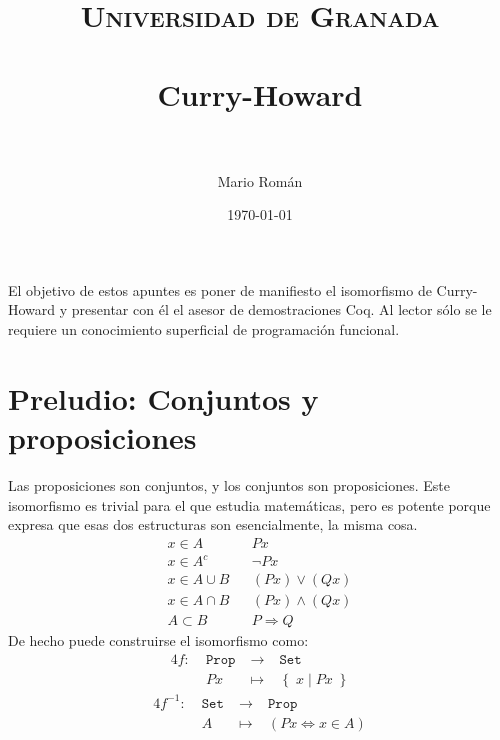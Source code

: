 \documentclass[paper=a4, fontsize=11pt, spanish]{scrartcl} %
\title{
\normalfont \normalsize
\textsc{Universidad de Granada} \\ [25pt] %
\horrule{0.5pt} \\[0.4cm] %
\huge Curry-Howard \\ %
\horrule{2pt} \\[0.5cm] %
}
\author{Mario Román} %
\date{\normalsize\today} %
\numberwithin{equation}{section} %
\numberwithin{figure}{section} %
\numberwithin{table}{section} %
\begin{document}


\maketitle
  El objetivo de estos apuntes es poner de manifiesto el isomorfismo de Curry-Howard y presentar con él
  el asesor de demostraciones Coq. Al lector sólo se le requiere un conocimiento
  superficial de programación funcional.

  \section*{Preludio: Conjuntos y proposiciones}
    Las proposiciones son conjuntos, y los conjuntos son proposiciones. Este isomorfismo
    es trivial para el que estudia matemáticas, pero es potente porque expresa que esas
    dos estructuras son esencialmente, la misma cosa.
    \begin{align*}
     x \in A && P x \\
     x \in A^c && \neg P x \\
     x \in A \cup B && (P x) \vee (Q x) \\
     x \in A \cap B && (P x) \wedge (Q x) \\
     A \subset B && P \Rightarrow Q
    \end{align*}
    De hecho puede construirse el isomorfismo como:
    \begin{alignat*}{4}
    f :\;& \mathtt{Prop} \;& \rightarrow \;& \mathtt{Set}        \\
	\;& P x           \;& \mapsto     \;&  \left\{\; x \;|\; P x\; \right\}      
    \end{alignat*}
    \begin{alignat*}{4}
    f^{-1} :\;& \mathtt{Set} \;&  \rightarrow  \;& \mathtt{Prop} \\
	    \;& A            \;&   \mapsto    \;& (Px \Leftrightarrow x \in A)
    \end{alignat*}
\end{document}
